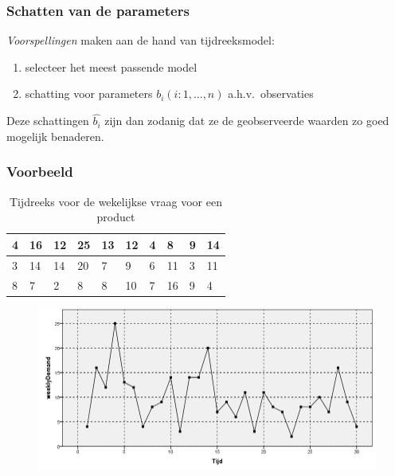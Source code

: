 \documentclass[aspectratio=169]{beamer}
\begin{document}
\begin{frame}
  \frametitle{Schatten van de parameters}

  \emph{Voorspellingen} maken aan de hand van tijdreeksmodel:

  \begin{enumerate}
    \item selecteer het meest passende model
    \item schatting voor parameters $b_i (i: 1, \dots, n)$ a.h.v.~observaties
  \end{enumerate}

  Deze schattingen $\widehat{b_i}$ zijn dan zodanig dat ze de geobserveerde waarden zo goed mogelijk benaderen.
\end{frame}

\begin{frame}
  \frametitle{Voorbeeld}

  \begin{table}[t]
    \centering
    \begin{tabular}{|l|l|l|l|l|l|l|l|l|l|}
      \hline
      4 & 16 & 12 & 25 & 13 & 12 & 4 & 8  & 9 & 14 \\ \hline
      3 & 14 & 14 & 20 & 7  & 9  & 6 & 11 & 3 & 11 \\ \hline
      8 & 7  & 2  & 8  & 8  & 10 & 7 & 16 & 9 & 4  \\ \hline
    \end{tabular}
    \label{tab:data}
    \caption{Tijdreeks voor de wekelijkse vraag voor een product}
  \end{table}

  \begin{figure}
    \centering
    \includegraphics[width=.7\textwidth]{img/tijdreeks11}
  \end{figure}
\end{frame}
\end{document}
